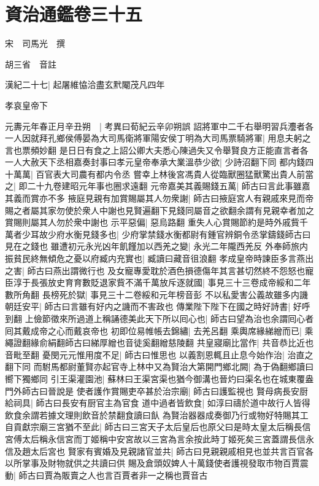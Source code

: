 \chapter{資治通鑑卷三十五}
宋　司馬光　撰

胡三省　音註

漢紀二十七|{
	起屠維恊洽盡玄黓閹茂凡四年}


孝哀皇帝下

元夀元年春正月辛丑朔　|{
	考異曰荀紀云辛卯朔誤}
詔將軍中二千右舉明習兵灋者各一人因就拜孔鄉侯傅晏為大司馬衛將軍陽安侯丁明為大司馬票騎將軍|{
	用息夫躬之言也票頻妙翻}
是日日有食之上詔公卿大夫悉心陳過失又令舉賢良方正能直言者各一人大赦天下丞相嘉奏封事曰孝元皇帝奉承大業溫恭少欲|{
	少詩沼翻下同}
都内錢四十萬萬|{
	百官表大司農有都内令丞}
嘗幸上林後宮馮貴人從臨獸圈猛獸驚出貴人前當之|{
	即二十九卷建昭元年事也圈求遠翻}
元帝嘉美其義賜錢五萬|{
	師古曰言此事雖嘉其義而賞亦不多}
掖庭見親有加賞賜屬其人勿衆謝|{
	師古曰掖庭宮人有親戚來見而帝賜之者屬其家勿使於衆人中謝也見賢遍翻下見錢同屬音之欲翻余謂有見親幸者加之賞賜則屬其人勿於衆中謝也}
示平惡偏|{
	惡烏路翻}
重失人心賞賜節約是時外戚貲千萬者少耳故少府水衡見錢多也|{
	少府掌禁錢水衡都尉有鍾官辨銅令丞掌鑄錢師古曰見在之錢也}
雖遭初元永光凶年飢饉加以西羌之變|{
	永光二年隴西羌反}
外奉師旅内振貧民終無傾危之憂以府臧内充實也|{
	臧讀曰藏音徂浪翻}
孝成皇帝時諫臣多言燕出之害|{
	師古曰燕出謂微行也}
及女寵專愛耽於酒色損德傷年其言甚切然終不怨怒也寵臣淳于長張放史育育數貶退家貲不滿千萬放斥逐就國|{
	事見三十三卷成帝綏和二年數所角翻}
長榜死於獄|{
	事見三十二卷綏和元年榜音彭}
不以私愛害公義故雖多内譏朝廷安平|{
	師古曰言雖有好内之譏而不害政也}
傳業陛下陛下在國之時好詩書|{
	好呼到翻}
上儉節徵來所過道上稱誦德美此天下所以囘心也|{
	師古曰望為治也余謂囘心者囘其戴成帝之心而戴哀帝也}
初即位易帷帳去錦繡|{
	去羌呂翻}
乘輿席緣綈繒而已|{
	乘繩證翻緣俞絹翻師古曰綈厚繒也音徒奚翻繒慈陵翻}
共皇寢廟比當作|{
	共音恭比近也音毗至翻}
憂閔元元惟用度不足|{
	師古曰惟思也}
以義割恩輒且止息今始作治|{
	治直之翻下同}
而駙馬都尉董賢亦起官寺上林中又為賢治大第開門鄉北闕|{
	為于偽翻鄉讀曰嚮下獨鄉同}
引王渠灌園池|{
	蘇林曰王渠宮渠也猶今御溝也晉灼曰渠名也在城東覆盎門外師古曰晉說是}
使者護作賞賜吏卒甚於治宗廟|{
	師古曰護監視也}
賢母病長安厨給祠具|{
	師古曰長安有厨官主為官食}
道中過者皆飲食|{
	如淳曰禱於道中故行人皆得飲食余謂若據文理則飲音於禁翻食讀曰飤}
為賢治器器成奏御乃行或物好特賜其工自貢獻宗廟三宮猶不至此|{
	師古曰三宮天子太后皇后也原父曰是時太皇太后稱長信宮傅太后稱永信宮而丁姬稱中安宮故以三宮為言余按此時丁姬死矣三宮蓋謂長信永信及趙太后宮也}
賢家有賓婚及見親諸官並共|{
	師古曰見親親戚相見也並共言百官各以所掌事及財物就供之共讀曰供}
賜及倉頭奴婢人十萬錢使者護視發取市物百賈震動|{
	師古曰賈為販賣之人也言百賈者非一之稱也賈音古}
